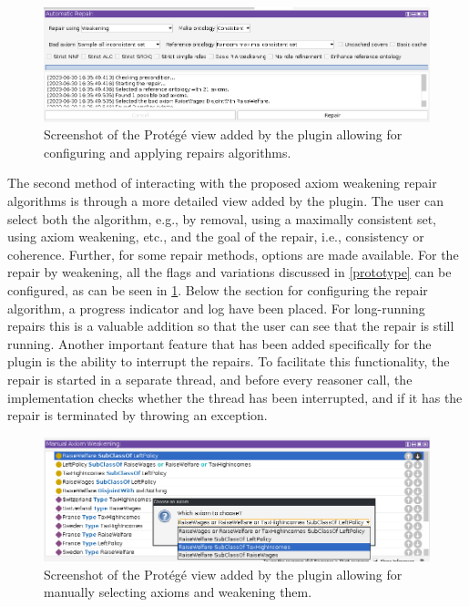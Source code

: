 \begin{figure}[ht]
  \centering
  \includegraphics[width=\textwidth]{resources/protege-repair.png}
  \caption{Screenshot of the Protégé view added by the plugin allowing for configuring and applying repairs algorithms.}
  \label{fig:protege-repair}
\end{figure}

The second method of interacting with the proposed axiom weakening repair algorithms is through a more detailed view added by the plugin. The user can select both the algorithm, e.g., by removal, using a maximally consistent set, using axiom weakening, etc., and the goal of the repair, i.e., consistency or coherence. Further, for some repair methods, options are made available. For the repair by weakening, all the flags and variations discussed in \cref{prototype} can be configured, as can be seen in \cref{fig:protege-repair}. Below the section for configuring the repair algorithm, a progress indicator and log have been placed. For long-running repairs this is a valuable addition so that the user can see that the repair is still running. Another important feature that has been added specifically for the plugin is the ability to interrupt the repairs. To facilitate this functionality, the repair is started in a separate thread, and before every reasoner call, the implementation checks whether the thread has been interrupted, and if it has the repair is terminated by throwing an exception.

\begin{figure}[ht]
  \centering
  \includegraphics[width=\textwidth]{resources/protege-manual.png}
  \caption{Screenshot of the Protégé view added by the plugin allowing for manually selecting axioms and weakening them.}
  \label{fig:protege-manual}
\end{figure}


